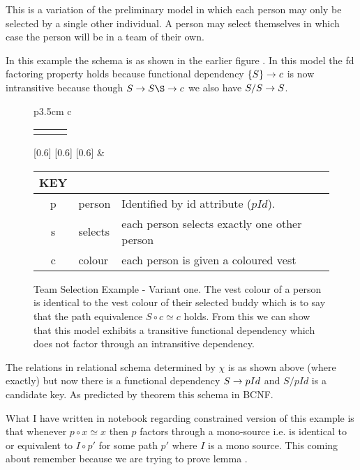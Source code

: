 
This is a variation of the preliminary model in which each person may only be selected by a single other individual.
A person may select themselves in which case the person will be in a team of their own. 

In this example the schema is as shown in the earlier figure . 
In this model the fd factoring property holds because functional dependency $\left\{S\right\} \rightarrow c$ is now intransitive because though
$S \morph S\S \morph c$ we also have $S/S \rightarrow S$.

\begin{figure} [h]
\begin{center}
\begin{tabular}{p{3.5cm} c}
\begin{tabular}{c p{1.5cm} c}
   \Rnode{p}{p} & & \Rnode{v}{v}
\end{tabular}
[0.6]
[0.6]
[0.6]
\idcomp
& \footnotesize
\begin{tabular}{c p{1.5cm} p{4cm}}
KEY && \\
\hline
p & person & Identified by id attribute ($pId$). \\
s & selects & each person selects exactly one other person \\
c & colour & each person is given a coloured vest 
\end{tabular} 
\end{tabular}
\end{center}
\caption{Team Selection Example  - Variant one. The  vest colour  of a person is 
identical to the vest colour of their selected buddy which is to say that the path equivalence $S \circ c \simeq c$ holds. From this
we can show that this model exhibits a transitive functional dependency which does not factor through an intransitive dependency.
}
\label{teamselectionvariantoneERschema}
\end{figure}

The relations in relational schema  determined by $\chi$ is as shown above (where exactly) 
but now there is a functional dependency $S \rightarrow pId$ and $S/pId$ is a candidate key. As predicted by 
theorem  this schema in BCNF. 

What I have written in notebook regarding constrained version of this example is that
whenever $p \circ x \simeq x$ then $p$ factors through a mono-source i.e. is identical to or equivalent to 
$I \circ p'$ for some path $p'$ where $I$ is a mono source. This coming about remember because we are trying to prove lemma 
.

